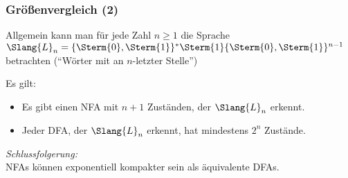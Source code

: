 \documentclass[aspectratio=1610,onlymath]{beamer}
\begin{document}
\begin{frame}\frametitle{Größenvergleich (2)}

Allgemein kann man für jede Zahl $n\geq 1$ die Sprache $\Slang{L}_n= \{\Sterm{0},\Sterm{1}\}^* \Sterm{1} \{\Sterm{0},\Sterm{1}\}^{n-1} $ betrachten ("`Wörter mit  an $n$-letzter Stelle"')
\medskip

Es gilt:
\begin{itemize}
\item Es gibt einen NFA mit $n+1$ Zuständen, der $\Slang{L}_n$ erkennt.
\item Jeder DFA, der $\Slang{L}_n$ erkennt, hat mindestens $2^n$ Zustände.
\end{itemize}

\bigskip

\emph{Schlussfolgerung:}\\
\alert{NFAs können exponentiell kompakter sein als äquivalente DFAs.}

\end{frame}
\end{document}
